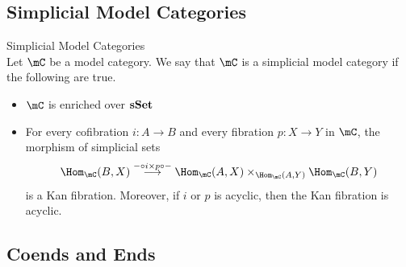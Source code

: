\documentclass[a4paper]{article}
\begin{document}
\subsection{Simplicial Model Categories}
\begin{defn}{Simplicial Model Categories}{}\\ Let $\mC$ be a model category. We say that $\mC$ is a simplicial model category if the following are true. 
\begin{itemize}
\item $\mC$ is enriched over $\bold{sSet}$
\item For every cofibration $i:A\to B$ and every fibration $p:X\to Y$ in $\mC$, the morphism of simplicial sets $$\Hom_\mC(B,X)\overset{-\circ i\times p\circ -}{\longrightarrow}\Hom_\mC(A,X)\times_{\Hom_\mC(A,Y)}\Hom_\mC(B,Y)$$ is a Kan fibration. Moreover, if $i$ or $p$ is acyclic, then the Kan fibration is acyclic. 
\end{itemize}
\end{defn}

\subsection{Coends and Ends}
\end{document}
